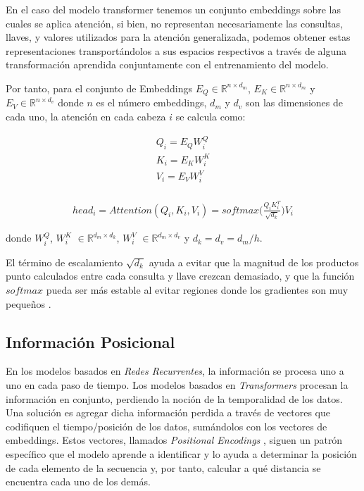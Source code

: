 En el caso del modelo transformer tenemos un conjunto embeddings sobre las cuales se aplica atención,
si bien, no representan necesariamente las consultas, llaves, y valores utilizados para la atención
generalizada, podemos obtener estas representaciones transportándolos a sus espacios respectivos a través de alguna
transformación aprendida conjuntamente con el entrenamiento del modelo.

Por tanto, para el conjunto de Embeddings  $E_Q \in \mathbb{R}^{n \times d_m}$,
$E_K \in \mathbb{R}^{n \times d_m}$ y $E_V \in \mathbb{R}^{n \times d_v}$ donde $n$ es el número
embeddings, $d_m$ y $d_v$ son las dimensiones de cada uno, la atención en cada cabeza $i$ se calcula
como:

\begin{equation}
    \begin{split}
        Q_i = E_Q W_i^Q\\
        K_i = E_K W_i^K\\
        V_i = E_V W_i^V\\
    \end{split}
\end{equation}

\begin{equation}
\begin{split}
    head_i = Attention(Q_i, K_i, V_i) = softmax\Big(\frac{Q_i K_i^T}{\sqrt{d_k}}\Big) V_i
    \label{eq:trans_att}
\end{split}
\end{equation}

\noindent donde $W_i^Q$, $W_i^K$ $\in \mathbb{R}^{d_m \times d_k}$, $W_i^V$ $\in \mathbb{R}^{d_m \times d_v}$
y $d_k=d_v=d_m/h$.

El término de escalamiento $\sqrt{d_k}$ ayuda a evitar que la magnitud de los productos punto calculados
entre cada consulta y llave crezcan demasiado, y que la función $softmax$ pueda ser más estable al evitar
regiones donde los gradientes son muy pequeños \cite{Vaswani}.



\subsection{Información Posicional}

En los modelos basados en \textit{Redes Recurrentes}, la información se procesa uno a uno en cada paso
de tiempo. Los modelos basados en \textit{Transformers} procesan la información en conjunto, perdiendo
la noción de la temporalidad de los datos. Una solución es agregar dicha información perdida a través
de vectores que codifiquen el tiempo/posición de los datos, sumándolos con los vectores de embeddings.
Estos vectores, llamados \textit{Positional Encodings} \cite{DBLP:journals/corr/GehringAGYD17}, siguen
un patrón específico que el modelo aprende a identificar y lo ayuda a determinar la posición de cada
elemento de la secuencia y, por tanto, calcular a qué distancia se encuentra cada uno de los demás.


